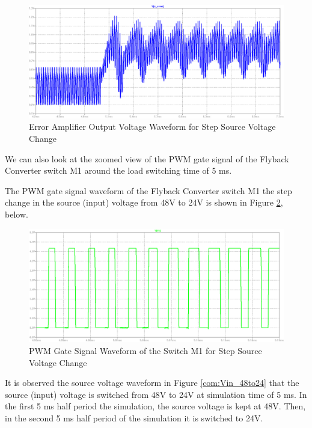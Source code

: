 \begin{figure}[H]
\begin{center}
\includegraphics[width=1\textwidth]{comp_simulations/Verror_48to24.png}
\caption{Error Amplifier Output Voltage Waveform for Step Source Voltage Change}
\label{com:Verror_48to24}
\end{center}
\end{figure}

We can also look at the zoomed view of the PWM gate signal of the Flyback Converter switch M1 around the load switching time of 5 ms.

The PWM gate signal waveform of the Flyback Converter switch M1 the step change in the source (input) voltage from 48V to 24V is shown in Figure \ref{com:dutycycle_48to24}, below.

\begin{figure}[H]
\begin{center}
\includegraphics[width=1\textwidth]{comp_simulations/dutycycle2_48to24.png}
\caption{PWM Gate Signal Waveform of the Switch M1 for Step Source Voltage Change}
\label{com:dutycycle_48to24}
\end{center}
\end{figure}

It is observed the source voltage waveform in Figure \ref{com:Vin_48to24} that the source (input) voltage is switched from 48V to 24V at simulation time of 5 ms. In the first 5 ms half period the simulation, the source voltage is kept at 48V. Then, in the second 5 ms half period of the simulation it is switched to 24V. 


